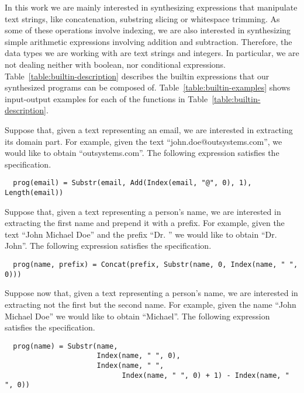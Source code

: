 In this work we are mainly interested in synthesizing expressions that
manipulate text strings, like concatenation, substring slicing or whitespace
trimming. As some of these operations involve indexing, we are also interested
in synthesizing simple arithmetic expressions involving addition and
subtraction. Therefore, the data types we are working with are text strings and
integers. In particular, we are not dealing neither with boolean, nor conditional
expressions. Table~\ref{table:builtin-description} describes the builtin
expressions that our synthesized programs can be composed of.
Table~\ref{table:builtin-examples} shows input-output examples for each of the
functions in Table~\ref{table:builtin-description}.

\begin{example}
  Suppose that, given a text representing an email, we are interested in
  extracting its domain part.
  For example, given the text ``john.doe@outsystems.com'', we would like to
  obtain ``outsystems.com''.
  The following expression satisfies the specification.

\begin{lstlisting}
  prog(email) = Substr(email, Add(Index(email, "@", 0), 1), Length(email))
\end{lstlisting}
\end{example}

\begin{example}\label{ex:first-name}
  Suppose that, given a text representing a person's name, we are interested in
extracting the first name and prepend it with a prefix. For example, given the
text ``John Michael Doe'' and the prefix ``Dr. '' we would like to obtain
``Dr. John''. The following expression satisfies the specification.
 
\begin{lstlisting}
  prog(name, prefix) = Concat(prefix, Substr(name, 0, Index(name, " ", 0)))
\end{lstlisting}
\end{example}

\begin{example}\label{ex:second-name}
  Suppose now that, given a text representing a person's name, we are interested
in extracting not the first but the second name. For example, given the name
``John Michael Doe'' we would like to obtain ``Michael''. The following
expression satisfies the specification.
 
\begin{lstlisting}
  prog(name) = Substr(name,
                      Index(name, " ", 0),
                      Index(name, " ",
                            Index(name, " ", 0) + 1) - Index(name, " ", 0))
\end{lstlisting}
\end{example}

